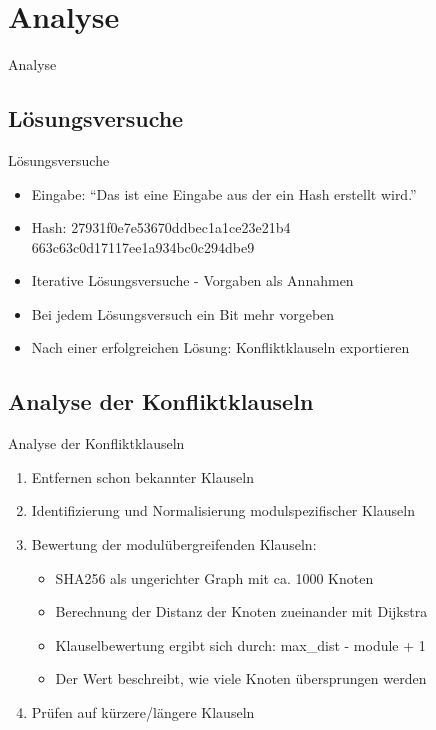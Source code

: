 \documentclass{beamer}
\begin{document}
\section{Analyse}
  \begin{frame}{}
    \begin{center}
      \Huge Analyse
    \end{center}
  \end{frame}
  \subsection{Lösungsversuche}
    \begin{frame}{Lösungsversuche}
      \begin{itemize}
        \setlength{\itemsep}{20pt}
        \item Eingabe: "`Das ist eine Eingabe aus der ein Hash erstellt wird."'
        \item Hash:\newline
              27931f0e7e53670ddbec1a1ce23e21b4\newline
              663c63c0d17117ee1a934bc0c294dbe9
        \item Iterative Lösungsversuche - Vorgaben als Annahmen
        \item Bei jedem Lösungsversuch ein Bit mehr vorgeben
        \item Nach einer erfolgreichen Lösung: Konfliktklauseln exportieren
      \end{itemize}
    \end{frame}
  \subsection{Analyse der Konfliktklauseln}
    \begin{frame}{Analyse der Konfliktklauseln}
      \begin{enumerate}
        \setlength{\itemsep}{20pt}
        \item Entfernen schon bekannter Klauseln
        \pause
        \item Identifizierung und Normalisierung modulspezifischer Klauseln
        \pause
        \item Bewertung der modulübergreifenden Klauseln:
        \begin{itemize}
          \item SHA256 als ungerichter Graph mit ca. 1000 Knoten
          \item Berechnung der Distanz der Knoten zueinander mit Dijkstra
          \item Klauselbewertung ergibt sich durch: max\_dist - module + 1
          \item Der Wert beschreibt, wie viele Knoten übersprungen werden
        \end{itemize}
        \pause
        \item Prüfen auf kürzere/längere Klauseln
      \end{enumerate}
    \end{frame}
\end{document}
